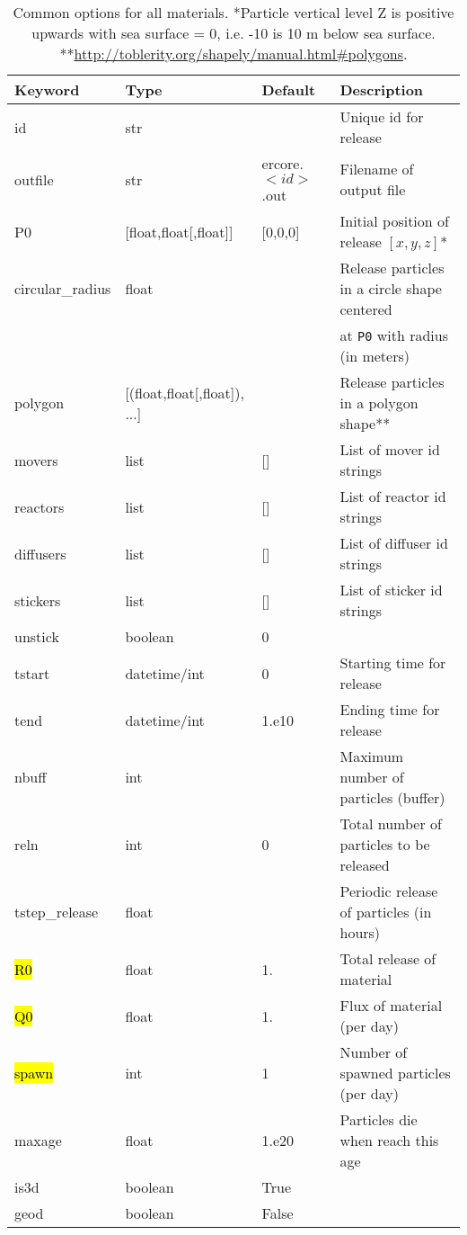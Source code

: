 \documentclass[a4paper]{article}
\begin{document}
\begin{table}[!htp]
\centering
\caption{Common options for all materials. *Particle vertical level Z is positive upwards with sea surface = 0, i.e. -10 is 10 m below sea surface.
**\url{http://toblerity.org/shapely/manual.html\#polygons}.
}
\label{tb:material_options}
\begin{tabular}{@{}llll@{}}
\toprule
Keyword & Type & Default & Description                         \\ 
\midrule
id          & str  &        & Unique id for release                \\
outfile     & str & ercore.$<id>$.out & Filename of output file \\
P0          & [float,float[,float]] & [0,0,0] & Initial position of release $[x,y,z]$*  \\
circular\_radius & float & & Release particles in a circle shape centered \\
                            & & & at \texttt{P0} with radius (in meters) \\ 
polygon &[(float,float[,float]), ...] & & Release particles in a polygon shape** \\
\midrule
movers      & list & []     & List of mover id strings             \\
reactors    & list & []     & List of reactor id strings \\
diffusers   & list & []     & List of diffuser id strings \\
\midrule
stickers    & list & []     & List of sticker id strings \\
unstick     & boolean & 0     & \\
\midrule
tstart      & datetime/int & 0 & Starting time for release \\
tend        & datetime/int & 1.e10 & Ending time for release \\
nbuff       & int  &       & Maximum number of particles (buffer) \\
reln        & int  & 0     & Total number of particles to be released  \\
tstep\_release & float &   & Periodic release of particles (in hours) \\
\midrule
\hl{R0}          & float & 1. & Total release of material  \\
\hl{Q0}          & float & 1. & Flux of material (per day)  \\
\hl{spawn}       & int & 1 &  Number of spawned particles (per day)  \\
maxage           & float & 1.e20 & Particles die when reach this age \\
\midrule
is3d        & boolean & True  & \\
geod        & boolean & False  & \\
\bottomrule
\end{tabular}
\end{table}
\FloatBarrier
\end{document}
